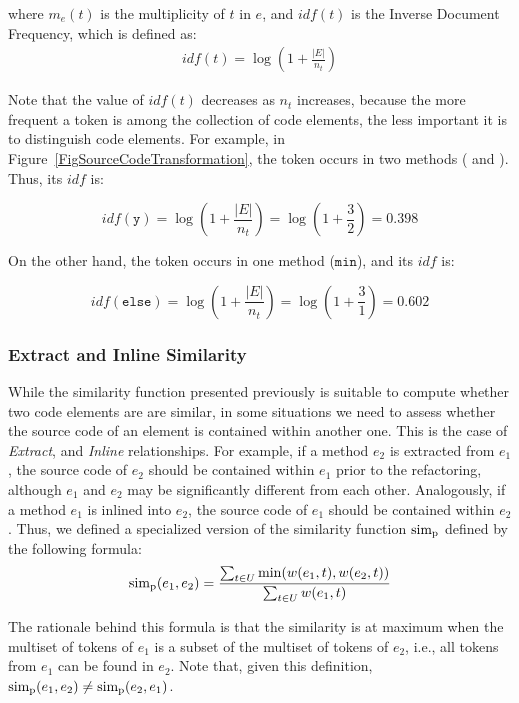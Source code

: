 \noindent where $m_e(t)$ is the multiplicity of $t$ in $e$, and $\mathit{idf}(t)$ is the Inverse Document Frequency, which is defined as:
\begin{align}
\mathit{idf}(t) = \log (1 + \frac{|E|}{n_t})
\end{align}

Note that the value of $\mathit{idf}(t)$ decreases as $n_t$ increases, because the more frequent a token is among the collection of code elements, the less important it is to distinguish code elements.
For example, in Figure~\ref{FigSourceCodeTransformation}, the token  occurs in two methods ( and ). Thus, its $\mathit{idf}$ is:

\[
\mathit{idf}(\mathtt{y}) = 
\log (1 + \frac{|E|}{n_t}) = 
\log (1 + \frac{3}{2}) = 0.398
\]

On the other hand, the token  occurs in one method ($\mathtt{min}$), and its $\mathit{idf}$ is:

\[
\mathit{idf}(\mathtt{else}) = 
\log (1 + \frac{|E|}{n_t}) = 
\log (1 + \frac{3}{1}) = 0.602
\]


\subsubsection{Extract and Inline Similarity}

While the similarity function presented previously is suitable to compute whether two code elements are are similar, in some situations we need to assess whether the source code of an element is contained within another one. This is the case of \emph{Extract}, and \emph{Inline} relationships. For example, if a method $e_2$ is extracted from $e_1$, the source code of $e_2$ should be contained within $e_1$ prior to the refactoring, although $e_1$ and $e_2$ may be significantly different from each other. Analogously, if a method $e_1$ is inlined into $e_2$, the source code of $e_1$ should be contained within $e_2$.
Thus, we defined a specialized version of the similarity function $\operatorname{sim_{p}}$ defined by the following formula:
\begin{align}
\operatorname{sim_{p}}(e_1, e_2) = \frac{\sum_{t \in U} \min(w(e_1, t), w(e_2, t))}
                        {\sum_{t \in U} w(e_1, t)}
\end{align}

The rationale behind this formula is that the similarity is at maximum when the multiset of tokens of $e_1$ is a subset of the multiset of tokens of $e_2$, i.e., all tokens from $e_1$ can be found in $e_2$. Note that, given this definition, $\operatorname{sim_{p}}(e_1, e_2) \neq \operatorname{sim_{p}}(e_2, e_1)$.


